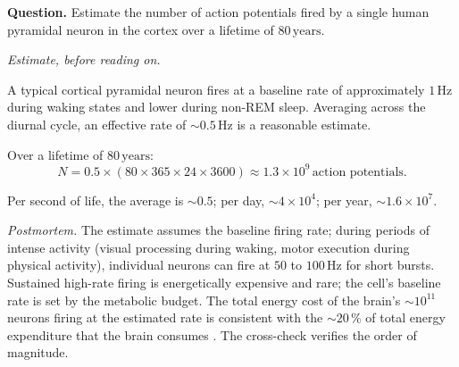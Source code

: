 \begin{estimation}
\textbf{Question.} Estimate the number of action potentials fired by
a single human pyramidal neuron in the cortex over a lifetime of
$80\,\text{years}$.

\smallskip
\textit{Estimate, before reading on.}

\smallskip
A typical cortical pyramidal neuron fires at a baseline rate of
approximately $1\,\text{Hz}$ during waking states and lower during
non-REM sleep. Averaging across the diurnal cycle, an effective rate
of $\sim 0.5\,\text{Hz}$ is a reasonable estimate.

Over a lifetime of $80\,\text{years}$:
\[
N = 0.5 \times (80 \times 365 \times 24 \times 3600) \approx 1.3 \times 10^9\,\text{action potentials}.
\]

Per second of life, the average is $\sim 0.5$; per day, $\sim 4 \times
10^4$; per year, $\sim 1.6 \times 10^7$.

\smallskip
\textit{Postmortem.} The estimate assumes the baseline firing rate;
during periods of intense activity (visual processing during waking,
motor execution during physical activity), individual neurons can
fire at $50$ to $100\,\text{Hz}$ for short bursts. Sustained
high-rate firing is energetically expensive and rare; the cell's
baseline rate is set by the metabolic budget. The total energy cost
of the brain's $\sim 10^{11}$ neurons firing at the estimated rate
is consistent with the $\sim 20\,\%$ of total energy expenditure that
the brain consumes \cite{paper:v6c07-attwell-laughlin-2001}. The
cross-check verifies the order of magnitude.
\end{estimation}

